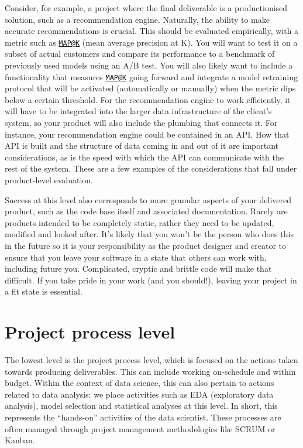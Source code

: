 \documentclass[
]{book}
\begin{document}
Consider, for example, a project where the final deliverable is a productionised solution, such as a recommendation engine. Naturally, the ability to make accurate recommendations is crucial. This should be evaluated empirically, with a metric such as \href{mailto:MAP@K}{\nolinkurl{MAP@K}} (mean average precision at K). You will want to test it on a subset of actual customers and compare its performance to a benchmark of previously used models using an A/B test. You will also likely want to include a functionality that measures \href{mailto:MAP@K}{\nolinkurl{MAP@K}} going forward and integrate a model retraining protocol that will be activated (automatically or manually) when the metric dips below a certain threshold. For the recommendation engine to work efficiently, it will have to be integrated into the larger data infrastructure of the client's system, so your product will also include the plumbing that connects it. For instance, your recommendation engine could be contained in an API. How that API is built and the structure of data coming in and out of it are important considerations, as is the speed with which the API can communicate with the rest of the system. These are a few examples of the considerations that fall under product-level evaluation.

Success at this level also corresponds to more granular aspects of your delivered product, such as the code base itself and associated documentation. Rarely are products intended to be completely static, rather they need to be updated, modified and looked after. It's likely that you won't be the person who does this in the future so it is your responsibility as the product designer and creator to ensure that you leave your software in a state that others can work with, including future you. Complicated, cryptic and brittle code will make that difficult. If you take pride in your work (and you should!), leaving your project in a fit state is essential.

\hypertarget{project-process-level}{%
\section{Project process level}\label{project-process-level}}

The lowest level is the project process level, which is focused on the actions taken towards producing deliverables. This can include working on-schedule and within budget. Within the context of data science, this can also pertain to actions related to data analysis: we place activities such as EDA (exploratory data analysis), model selection and statistical analyses at this level. In short, this represents the ``hands-on'' activities of the data scientist. These processes are often managed through project management methodologies like SCRUM or Kanban.
\end{document}
